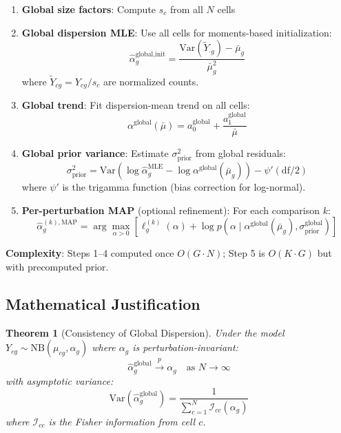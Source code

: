 \documentclass[11pt]{article}
\newtheorem{theorem}{Theorem}
\theoremstyle{definition}
\theoremstyle{remark}
\begin{document}
\begin{enumerate}
    \item \textbf{Global size factors}: Compute $s_c$ from all $N$ cells
    
    \item \textbf{Global dispersion MLE}: Use all cells for moments-based initialization:
    \begin{equation}
    \hat{\alpha}_g^{\text{global},\text{init}} = \frac{\text{Var}(\tilde{Y}_{\cdot g}) - \bar{\mu}_g}{\bar{\mu}_g^2}
    \end{equation}
    where $\tilde{Y}_{cg} = Y_{cg} / s_c$ are normalized counts.
    
    \item \textbf{Global trend}: Fit dispersion-mean trend on all cells:
    \begin{equation}
    \alpha^{\text{global}}(\bar{\mu}) = a_0^{\text{global}} + \frac{a_1^{\text{global}}}{\bar{\mu}}
    \end{equation}
    
    \item \textbf{Global prior variance}: Estimate $\sigma_{\text{prior}}^2$ from global residuals:
    \begin{equation}
    \sigma_{\text{prior}}^2 = \text{Var}\left(\log \hat{\alpha}_g^{\text{MLE}} - \log \alpha^{\text{global}}(\bar{\mu}_g)\right) - \psi'(\text{df}/2)
    \end{equation}
    where $\psi'$ is the trigamma function (bias correction for log-normal).
    
    \item \textbf{Per-perturbation MAP} (optional refinement): For each comparison $k$:
    \begin{equation}
    \hat{\alpha}_g^{(k),\text{MAP}} = \arg\max_{\alpha > 0} \left[ \ell_g^{(k)}(\alpha) + \log p(\alpha \mid \alpha^{\text{global}}(\bar{\mu}_g), \sigma_{\text{prior}}^{\text{global}}) \right]
    \end{equation}
\end{enumerate}

\textbf{Complexity}: Steps 1--4 computed once $O(G \cdot N)$; Step 5 is $O(K \cdot G)$ but with precomputed prior.

\subsection{Mathematical Justification}

\begin{theorem}[Consistency of Global Dispersion]
Under the model $Y_{cg} \sim \text{NB}(\mu_{cg}, \alpha_g)$ where $\alpha_g$ is perturbation-invariant:
\begin{equation}
\hat{\alpha}_g^{\text{global}} \xrightarrow{p} \alpha_g \quad \text{as } N \to \infty
\end{equation}
with asymptotic variance:
\begin{equation}
\text{Var}(\hat{\alpha}_g^{\text{global}}) = \frac{1}{\sum_{c=1}^{N} \mathcal{I}_{cc}(\alpha_g)}
\end{equation}
where $\mathcal{I}_{cc}$ is the Fisher information from cell $c$.
\end{theorem}
\end{document}
